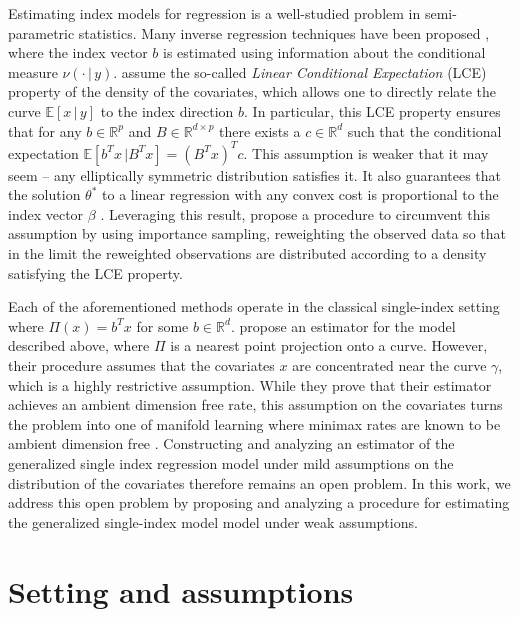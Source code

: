 \documentclass[11pt]{article}
\begin{document}
Estimating index models for regression is a well-studied problem in semi-parametric statistics. Many inverse regression techniques have been proposed \cite{li1991sliced, li2005contour, li2007directional, dennis2000save}, where the index vector $b$ is estimated using information about the conditional measure $\nu(\cdot \, |\, y)$. \citet{li1991sliced} assume the so-called \textit{Linear Conditional Expectation} (LCE) property of the density of the covariates, which allows one to directly relate the curve $\mathbb{E}[x\,|\,y]$ to the index direction $b$. In particular, this LCE property ensures that for any $b \in \mathbb{R}^p$ and $B \in \mathbb{R}^{d\times p}$ there exists a $c \in \mathbb{R}^d$ such that the conditional expectation $\mathbb{E}[b^{T}x \, | B^{T}x] = (B^{T}x)^T c$. This assumption is weaker that it may seem -- any elliptically symmetric distribution satisfies it. It also guarantees that the solution $\theta^*$ to a linear regression with any convex cost is proportional to the index vector $\beta$ \cite{li1989regression}. Leveraging this result, \citet{Newey_Ruud_2005} propose a procedure to circumvent this assumption by using importance sampling, reweighting the observed data so that in the limit the reweighted observations are distributed according to a density satisfying the LCE property. 

Each of the aforementioned methods operate in the classical single-index setting where $\Pi(x) = b^Tx$ for some $b \in \mathbb{R}^d$. \citet{wu2024conditional} propose an estimator for the model described above, where $\Pi$ is a nearest point projection onto a curve. However, their procedure assumes that the covariates $x$ are concentrated near the curve $\gamma$, which is a highly restrictive assumption. While they prove that their estimator achieves an ambient dimension free rate, this assumption on the covariates turns the problem into one of manifold learning where minimax rates are known to be ambient dimension free \cite{genovese2012minimax}. Constructing and analyzing an estimator of the generalized single index regression model under mild assumptions on the distribution of the covariates therefore remains an open problem. In this work, we address this open problem by proposing and analyzing a procedure for estimating the generalized single-index model model under weak assumptions.

\section{Setting and assumptions}
\end{document}
